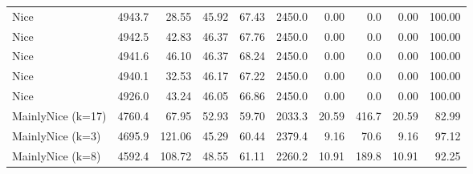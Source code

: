 \documentclass[journal,10pt,twoside]{IEEEtran}
\begin{document}
\begin{table}[ht]
\begin{tabular}{l|rrrr|rrrrr}
		Nice              & 4943.7 &  28.55 &  45.92 &   67.43 & 2450.0 &                   0.00 &    0.0 &                    0.00 &   100.00 \\
		Nice              & 4942.5 &  42.83 &  46.37 &   67.76 & 2450.0 &                   0.00 &    0.0 &                    0.00 &   100.00 \\
		Nice              & 4941.6 &  46.10 &  46.37 &   68.24 & 2450.0 &                   0.00 &    0.0 &                    0.00 &   100.00 \\
		Nice              & 4940.1 &  32.53 &  46.17 &   67.22 & 2450.0 &                   0.00 &    0.0 &                    0.00 &   100.00 \\
		Nice              & 4926.0 &  43.24 &  46.05 &   66.86 & 2450.0 &                   0.00 &    0.0 &                    0.00 &   100.00 \\
		MainlyNice (k=17) & 4760.4 &  67.95 &  52.93 &   59.70 & 2033.3 &                  20.59 &  416.7 &                   20.59 &    82.99 \\
		MainlyNice (k=3)  & 4695.9 & 121.06 &  45.29 &   60.44 & 2379.4 &                   9.16 &   70.6 &                    9.16 &    97.12 \\
		MainlyNice (k=8)  & 4592.4 & 108.72 &  48.55 &   61.11 & 2260.2 &                  10.91 &  189.8 &                   10.91 &    92.25 \\ \bottomrule
	\end{tabular}
\end{table}
\end{document}
